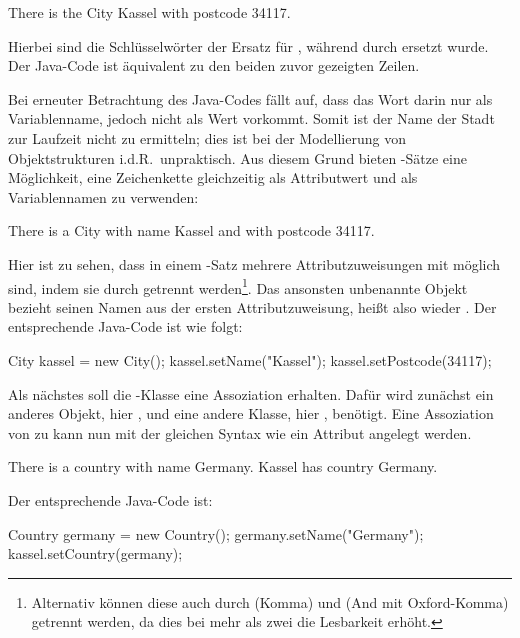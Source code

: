 \begin{codeblock}
    There is the City Kassel with postcode 34117.
\end{codeblock}

Hierbei sind die Schlüsselwörter  der Ersatz für , während  durch  ersetzt wurde.
Der Java-Code ist äquivalent zu den beiden zuvor gezeigten Zeilen.

Bei erneuter Betrachtung des Java-Codes fällt auf, dass das Wort  darin nur als Variablenname, jedoch nicht als Wert vorkommt.
Somit ist der Name der Stadt zur Laufzeit nicht zu ermitteln;
dies ist bei der Modellierung von Objektstrukturen i.d.R.\ unpraktisch.
Aus diesem Grund bieten -Sätze eine Möglichkeit, eine Zeichenkette gleichzeitig als Attributwert und als Variablennamen zu verwenden:

\begin{codeblock}
    There is a City with name Kassel and with postcode 34117.
\end{codeblock}

Hier ist zu sehen, dass in einem -Satz mehrere Attributzuweisungen mit  möglich sind, indem sie durch  getrennt werden\footnote{
Alternativ können diese auch durch \code{,} (Komma) und  (And mit Oxford-Komma) getrennt werden, da dies bei mehr als zwei  die Lesbarkeit erhöht.
}.
Das ansonsten unbenannte Objekt bezieht seinen Namen aus der ersten Attributzuweisung, heißt also wieder .
Der entsprechende Java-Code ist wie folgt:

\begin{jcodeblock}
    City kassel = new City();
    kassel.setName("Kassel");
    kassel.setPostcode(34117);
\end{jcodeblock}

Als nächstes soll die -Klasse eine Assoziation erhalten.
Dafür wird zunächst ein anderes Objekt, hier , und eine andere Klasse, hier , benötigt.
Eine Assoziation von  zu  kann nun mit der gleichen Syntax wie ein Attribut angelegt werden.

\begin{codeblock}
    There is a country with name Germany.
    Kassel has country Germany.
\end{codeblock}

Der entsprechende Java-Code ist:

\begin{jcodeblock}
    Country germany = new Country();
    germany.setName("Germany");
    kassel.setCountry(germany);
\end{jcodeblock}


